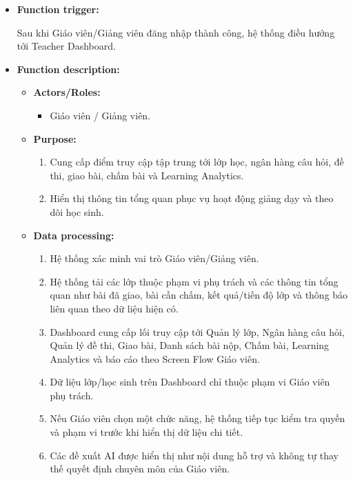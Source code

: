 \documentclass[12pt,a4paper,oneside]{report}
\begin{document}
\begin{itemize}

    \item \textbf{Function trigger:}

    Sau khi Giáo viên/Giảng viên đăng nhập thành công, hệ thống điều hướng tới Teacher Dashboard.

    \item \textbf{Function description:}

    \begin{itemize}

        \item \textbf{Actors/Roles:}
        \begin{itemize}
            \item Giáo viên / Giảng viên.
        \end{itemize}

        \item \textbf{Purpose:}
        \begin{enumerate}
            \item Cung cấp điểm truy cập tập trung tới lớp học, ngân hàng câu hỏi, đề thi, giao bài, chấm bài và Learning Analytics.
            \item Hiển thị thông tin tổng quan phục vụ hoạt động giảng dạy và theo dõi học sinh.
        \end{enumerate}

        \item \textbf{Data processing:}
        \begin{enumerate}
            \item Hệ thống xác minh vai trò Giáo viên/Giảng viên.
            \item Hệ thống tải các lớp thuộc phạm vi phụ trách và các thông tin tổng quan như bài đã giao, bài cần chấm, kết quả/tiến độ lớp và thông báo liên quan theo dữ liệu hiện có.
            \item Dashboard cung cấp lối truy cập tới Quản lý lớp, Ngân hàng câu hỏi, Quản lý đề thi, Giao bài, Danh sách bài nộp, Chấm bài, Learning Analytics và báo cáo theo Screen Flow Giáo viên.
            \item Dữ liệu lớp/học sinh trên Dashboard chỉ thuộc phạm vi Giáo viên phụ trách.
            \item Nếu Giáo viên chọn một chức năng, hệ thống tiếp tục kiểm tra quyền và phạm vi trước khi hiển thị dữ liệu chi tiết.
            \item Các đề xuất AI được hiển thị như nội dung hỗ trợ và không tự thay thế quyết định chuyên môn của Giáo viên.
        \end{enumerate}


\end{itemize}
\end{itemize}
\end{document}
